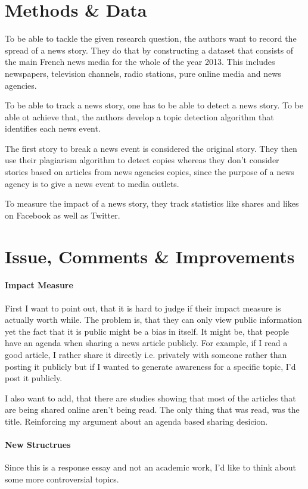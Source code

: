 \documentclass[12pt]{article}
\begin{document}
\section{Methods \& Data}
To be able to tackle the given research question, the authors want to record
the spread of a news story. They do that by constructing a dataset that
consists of the main French news media for the whole of the year 2013. This
includes newspapers, television channels, radio stations, pure online media and
news agencies.

To be able to track a news story, one has to be able to detect a news story.
To be able ot achieve that, the authors develop a topic detection algorithm
that identifies each news event.

The first story to break a news event is considered the original story. They
then use their plagiarism algorithm to detect copies whereas they don't
consider stories based on articles from news agencies copies, since the purpose
of a news agency is to give a news event to media outlets.

To measure the impact of a news story, they track statistics like shares and
likes on Facebook as well as Twitter.

\section{Issue, Comments \& Improvements}
\paragraph{Impact Measure} First I want to point out, that it is hard to judge
if their impact measure is actually worth while. The problem is, that they can
only view public information yet the fact that it is public might be a bias
in itself. It might be, that people have an agenda when sharing a news article
publicly. For example, if I read a good article, I rather share it directly
i.e. privately with someone rather than posting it publicly but if I wanted to
generate awareness for a specific topic, I'd post it publicly.

I also want to add, that there are studies showing that most of the articles
that are being shared online aren't being read. The only thing that was read,
was the title. Reinforcing my argument about an agenda based sharing desicion.

\paragraph{New Structrues} Since this is a response essay
and not an academic work, I'd like to think about some more controversial
topics.
\end{document}
